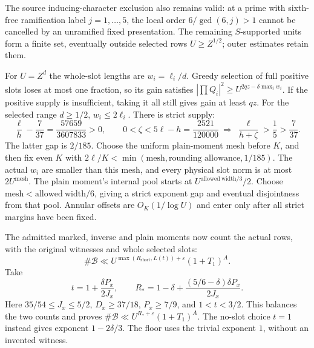 \documentclass[11pt,a4paper]{article}
\theoremstyle{definition}
\newcommand{\eps}{\varepsilon}
\begin{document}
The source inducing-character exclusion also remains valid:
at a prime with sixth-free ramification label $j=1,\ldots,5$,
the local order $6/\gcd(6,j)>1$ cannot be cancelled by an unramified
fixed presentation. The remaining $S$-supported units form a finite
set, eventually outside selected rows $U\ge Z^{1/2}$; outer estimates
retain them.

For $U=Z^d$ the whole-slot lengths are $w_i=\ell_i/d$.
Greedy selection of full positive slots loses at most one fraction,
so its gain satisfies
$|\prod Q_i|^2\ge U^{2qz-\delta\max_iw_i}$.
If the positive supply is insufficient, taking it all still gives
gain at least $qz$. For the selected range $d\ge1/2$,
$w_i\le2\ell_i$. There is strict supply:
\[
 \frac{\ell}{h}-\frac7{37}=\frac{57659}{3607833}>0,\qquad
 0<\zeta<5\ell-h=\frac{2521}{120000}
 \ \Longrightarrow\ \frac{\ell}{h+\zeta}>\frac15>\frac7{37}.
\]
The latter gap is $2/185$. Choose the uniform plain-moment mesh
before $K$, and then fix even $K$ with
$2\ell/K<\min(\text{mesh},\text{rounding allowance},1/185)$.
The actual $w_i$ are smaller than this mesh, and every physical
slot norm is at most $2U^{\mathrm{mesh}}$.
The plain moment's internal pool starts at
$U^{\mathrm{allowed\ width}/3}/2$.
Choose $\mathrm{mesh}<\mathrm{allowed\ width}/6$, giving a strict
exponent gap and eventual disjointness from that pool.
Annular offsets are $O_K(1/\log U)$
and enter only after all strict margins have been fixed.

The admitted marked, inverse and plain moments now count the
actual rows, with the original witnesses and whole selected slots:
\[
 \#\mathcal B\ll
 U^{\max(R_{\mathrm{short}},L(t))+\eps}(1+T_1)^A.
\]
Take
\begin{equation}\label{eq:R}
 t=1+\frac{\delta P_x}{2J_x},\qquad
 R_*=1-\delta+
      \frac{(5/6-\delta)\delta P_x}{2J_x}.
\end{equation}
Here $35/54\le J_x\le5/2$, $D_x\ge37/18$, $P_x\ge7/9$,
and $1<t<3/2$. This balances the two counts and proves
$\#\mathcal B\ll U^{R_*+\eps}(1+T_1)^A$.
The no-slot choice $t=1$ instead gives exponent $1-2\delta/3$.
The floor uses the trivial exponent $1$, without an invented witness.
\end{document}
